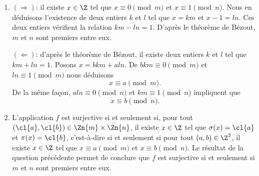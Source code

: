 \begin{enumerate}
  \item 
    $(\Rightarrow)$: il existe $x\in\Z$ tel que $x\equiv 0\pmod{m}$ et 
    $x\equiv 1\pmod{n}$. Nous en déduisons l'existence de deux entiers $k$ et
    $l$ tel que $x = km$ et $x - 1 = ln$. Ces deux entiers vérifient la relation
    $km - ln = 1$. D'après le théorème de Bézout, $m$ et $n$ sont premiers entre
    eux.

    $(\Leftarrow)$: d'après le théorème de Bézout, il existe deux entiers $k$ et
    $l$ tel que $km + ln = 1$. Posons $x = bkm + aln$. 
    De $bkm \equiv 0 \pmod{m}$ et $ln \equiv 1\pmod{m}$ nous déduisons
    \[
      x\equiv a\pmod{m}.
    \]
    De la même façon, $aln \equiv 0 \pmod{n}$ et $km\equiv 1\pmod{n}$ impliquent
    que
    \[
      x\equiv b\pmod{n}.
    \]

  \item
    L'application $f$ est surjective si et seulement si, pour tout
    $(\cl{a},\cl{b})\in\Zn{m}\times\Zn{n}$, il existe $x\in\Z$ tel que 
    $\sigma(x)=\cl{a}$ et $\pi(x)=\cl{b}$, c'est-à-dire si et seulement si pour
    tout $(a,b)\in\Z^2$, il existe $x\in\Z$ tel que $x\equiv a\pmod{m}$ et
    $x\equiv b\pmod{n}$. Le résultat de la question précédente permet de
    conclure que $f$ est surjective si et seulement si $m$ et $n$ sont premiers
    entre eux.
\end{enumerate}
